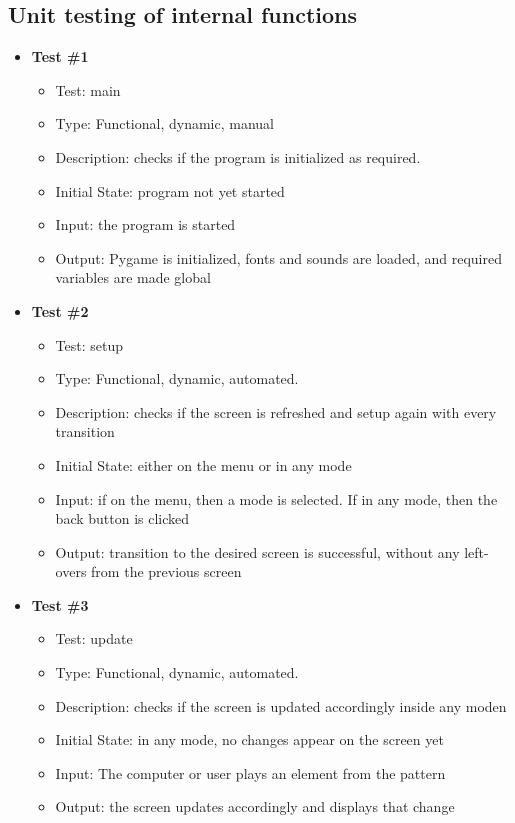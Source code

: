 \documentclass[12pt, titlepage]{article}
\begin{document}
\subsection{Unit testing of internal functions}

\begin{itemize}
\item \textbf{Test \#1}
\begin{itemize}
\item Test: main
\item Type: Functional, dynamic, manual		
\item Description: checks if the program is initialized as required.	
\item Initial State: program not yet started
\item Input: the program is started
\item Output:  Pygame is initialized, fonts and sounds are loaded, and required variables are made global
\end{itemize}

\item \textbf{Test \#2}
\begin{itemize}
\item Test: setup
\item Type: Functional, dynamic, automated.		
\item Description:  checks if the screen is refreshed and setup again with every transition	
\item Initial State: either on the menu or in any mode
\item Input: if on the menu, then a mode is selected. If in any mode, then the back button is clicked
\item Output: transition to the desired screen is successful, without any left-overs from the previous screen
\end{itemize}


\item \textbf{Test \#3}
\begin{itemize}
\item Test: update
\item Type: Functional, dynamic, automated.		
\item Description:   checks if the screen is updated accordingly inside any moden	
\item Initial State:  in any mode, no changes appear on the screen yet
\item Input: The computer or user plays an element from the pattern
\item Output: the screen updates accordingly and displays that change
\end{itemize}



\end{itemize}
\end{document}
